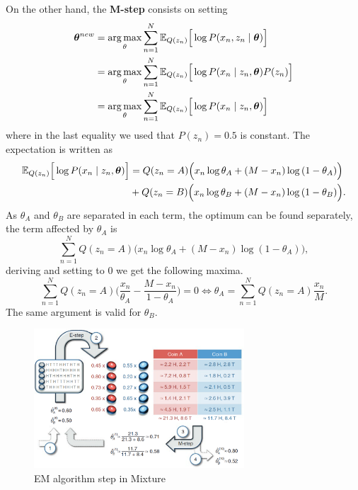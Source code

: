 On the other hand, the \textbf{M-step} consists on setting
\[
  \begin{aligned}
    \bm{\theta}^{new} &= \operatorname*{arg\,max}_{\theta} \sum_{n=1}^{N}\mathbb{E}_{Q(z_{n})}\Big[\log P(x_{n}, z_{n} \mid \bm{\theta})\Big]\\
    &= \operatorname*{arg\,max}_{\theta} \sum_{n=1}^{N}\mathbb{E}_{Q(z_{n})}\Big[\log P(x_{n} \mid z_{n}, \bm{\theta})P(z_{n})\Big]\\
    &= \operatorname*{arg\,max}_{\theta} \sum_{n=1}^{N}\mathbb{E}_{Q(z_{n})}\Big[\log P(x_{n} \mid z_{n}, \bm{\theta})\Big]
  \end{aligned}
\]
where in the last equality we used that \(P(z_{n}) = 0.5\) is constant. The expectation is written as
\[
  \begin{aligned}
    \mathbb{E}_{Q(z_{n})}\Big[\log P(x_{n} \mid z_{n}, \bm{\theta})\Big] &= Q(z_{n} = A)\Big( x_{n}\log{\theta_{A}} + (M - x_{n})\log{(1 - \theta_{A})} \Big)\\
    &+ Q(z_{n} = B)\Big( x_{n}\log{\theta_{B}} + (M - x_{n})\log{(1 - \theta_{B})} \Big).
  \end{aligned}
\]
As \(\theta_{A}\) and \(\theta_{B}\) are separated in each term, the optimum can be found separately, the term affected by \(\theta_{A}\) is
\[
  \sum_{n=1}^{N} Q(z_{n}=A) \Big(x_{n}\log{\theta_{A}} + (M - x_{n})\log{(1-\theta_{A})}\Big),
\]
deriving and setting to \(0\) we get the following maxima.
\[
  \sum_{n=1}^{N}Q(z_{n}=A)\Big(\frac{x_{n}}{\theta_{A}} - \frac{M - x_{n}}{1- \theta_{A}}\Big) = 0 \iff \theta_{A} = \sum_{n=1}^{N}Q(z_{n}=A)\frac{x_{n}}{M}.
\]
The same argument is valid for \(\theta_{B}\).

\begin{figure}
  \centering
  \includegraphics[width=0.7\textwidth]{tex/images/mixture}
  \caption{EM algorithm step in Mixture~\cite{do2008expectation}}\label{fig:mixture}
\end{figure}

